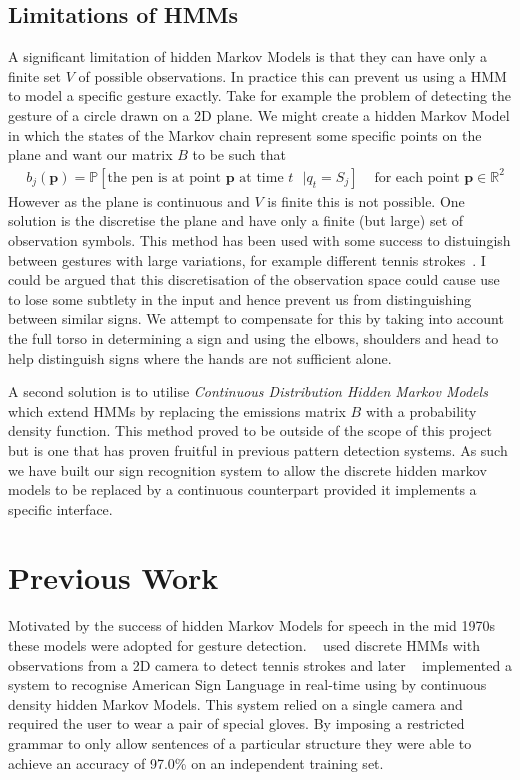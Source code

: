 \subsection{Limitations of HMMs}
A significant limitation of hidden Markov Models is that they can have only a finite set $V$ of possible observations. In practice this can prevent us using a HMM to model a specific gesture exactly. Take for example the problem of detecting the gesture of a circle drawn on a 2D plane. We might create a hidden Markov Model in which the states of the Markov chain represent some specific points on the plane and want our matrix $B$ to be such that
\begin{align*}
&b_j(\bm{p}) = \mathbb{P}[\text{the pen is at point $\bm{p}$ at time $t$ } | q_t = S_j] &\text{ for each point $\bm{p}\in\mathbb{R}^2$}
\end{align*}
However as the plane is continuous and $V$ is finite this is not possible. One solution is the discretise the plane and have only a finite (but large) set of observation symbols. This method has been used with some success to distuingish between gestures with large variations, for example different tennis strokes~\citep{yamato1992recognizing}. I could be argued that this discretisation of the observation space could cause use to lose some subtlety in the input and hence prevent us from distinguishing between similar signs. We attempt to compensate for this by taking into account the full torso in determining a sign and using the elbows, shoulders and head to help distinguish signs where the hands are not sufficient alone.

A second solution is to utilise \emph{Continuous Distribution Hidden Markov Models} which extend HMMs by replacing the emissions matrix $B$ with a probability density function. This method proved to be outside of the scope of this project but is one that has proven fruitful in previous pattern detection systems. As such we have built our sign recognition system to allow the discrete hidden markov models to be replaced by a continuous counterpart provided it implements a specific interface.


\section{Previous Work}
Motivated by the success of hidden Markov Models for speech in the mid 1970s \citep{baker1975dragon, jelinek1975design} these models were adopted for gesture detection. ~\citet{yamato1992recognizing} used discrete HMMs with observations from a 2D camera to detect tennis strokes and later ~\citet{starner1995real} implemented a system to recognise American Sign Language in real-time using by continuous density hidden Markov Models. This system relied on a single camera and required the user to wear a pair of special gloves. By imposing a restricted grammar to only allow sentences of a particular structure they were able to achieve an accuracy of 97.0\% on an independent training set. 

